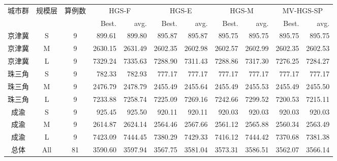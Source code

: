 \begin{tabular}{ccc*{8}{r}}
\toprule
\multirow{2}{*}{城市群} & \multirow{2}{*}{规模层} & \multirow{2}{*}{算例数} & \multicolumn{2}{c}{HGS-F} & \multicolumn{2}{c}{HGS-E} & \multicolumn{2}{c}{HGS-M} & \multicolumn{2}{c}{MV-HGS-SP}\\
\cmidrule(lr){4-5}\cmidrule(lr){6-7}\cmidrule(lr){8-9}\cmidrule(lr){10-11}
 & & & Best. & avg. & Best. & avg. & Best. & avg. & Best. & avg.\\
\midrule
京津冀 & S & 9 & 899.61 & 899.80 & 895.87 & 895.87 & 895.75 & 895.75 & 895.75 & 895.75\\
京津冀 & M & 9 & 2630.15 & 2631.49 & 2602.35 & 2602.98 & 2602.57 & 2602.99 & 2602.35 & 2602.53\\
京津冀 & L & 9 & 7329.24 & 7335.63 & 7288.90 & 7311.43 & 7288.86 & 7317.30 & 7276.25 & 7284.27\\
珠三角 & S & 9 & 782.33 & 782.93 & 777.17 & 777.17 & 777.17 & 777.17 & 777.17 & 777.17\\
珠三角 & M & 9 & 2476.79 & 2478.79 & 2455.49 & 2455.64 & 2455.49 & 2455.53 & 2455.49 & 2455.50\\
珠三角 & L & 9 & 7233.88 & 7258.74 & 7225.09 & 7269.16 & 7242.66 & 7299.52 & 7200.53 & 7215.11\\
成渝 & S & 9 & 925.45 & 925.50 & 920.11 & 920.11 & 920.03 & 920.03 & 920.03 & 920.03\\
成渝 & M & 9 & 2614.87 & 2624.14 & 2564.46 & 2567.66 & 2561.12 & 2565.88 & 2560.34 & 2563.49\\
成渝 & L & 9 & 7423.09 & 7444.45 & 7380.29 & 7429.33 & 7416.12 & 7444.42 & 7370.68 & 7381.38\\
总体 & All & 81 & 3590.60 & 3597.94 & 3567.75 & 3581.04 & 3573.31 & 3586.51 & 3562.07 & 3566.14\\
\bottomrule
\end{tabular}
